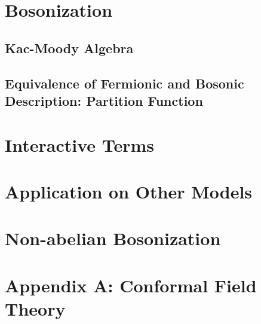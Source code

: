 \documentclass[10pt,nofootinbib]{revtex4}
\begin{document}
\section{Bosonization}
	\subsection{Kac-Moody Algebra}
	\subsection{Equivalence of Fermionic and Bosonic Description: Partition Function}

\section{Interactive Terms}

\section{Application on Other Models}

\section{Non-abelian Bosonization}

\section*{Appendix A: Conformal Field Theory}
\end{document}
